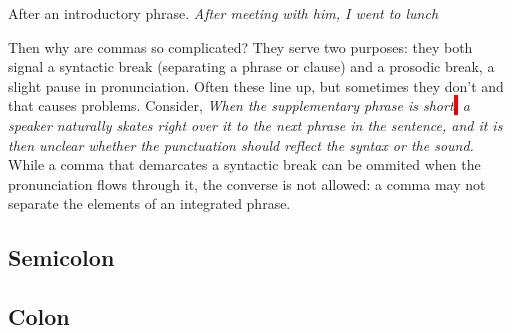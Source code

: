 \documentclass{article}
\newcommand{\hlq}[1]{\colorbox{red}{#1}}
\newcommand{\example}[1]{\newline \textit{#1}}
\begin{document}
After an introductory phrase.
\example{After meeting with him, I went to lunch}



Then why are commas so complicated? They serve two purposes: they both signal a syntactic break (separating a phrase or clause) and a prosodic break, a slight pause in pronunciation.
Often these line up, but sometimes they don't and that causes problems. Consider,
\example{When the supplementary phrase is short\hlq{,} a speaker naturally skates right over it to the next phrase in the sentence, and it is then unclear whether the punctuation should reflect the syntax or the sound.}
While a comma that demarcates a syntactic break can be ommited when the pronunciation flows through it, the converse is not allowed: a comma may not separate the elements of an integrated phrase.

\subsection{Semicolon}

\subsection{Colon}
\end{document}
